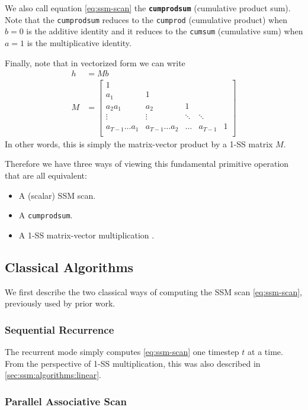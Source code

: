 \documentclass{article}
\begin{document}
We also call equation \eqref{eq:ssm-scan} the \textbf{\texttt{cumprodsum}} (cumulative product sum).
Note that the \texttt{cumprodsum} reduces to the \texttt{cumprod} (cumulative product) when $b = 0$ is the additive identity and it reduces to the \texttt{cumsum} (cumulative sum) when $a=1$ is the multiplicative identity.

Finally, note that in vectorized form we can write
\begin{align*}
  h &= M b \\
  M &=
  \begin{bmatrix}
    1 & \\
    a_1 & 1 & \\
    a_2a_1 & a_2 & 1 \\
    \vdots & \vdots & \ddots & \ddots \\
    a_{T-1}\dots a_1 & a_{T-1}\dots a_2 & \dots & a_{T-1} & 1 \\
  \end{bmatrix}
\end{align*}
In other words, this is simply the matrix-vector product by a 1-SS matrix $M$.

Therefore we have three ways of viewing this fundamental primitive operation that are all equivalent:
\begin{itemize}
  \item A (scalar) SSM scan.
  \item A \texttt{cumprodsum}.
  \item A 1-SS matrix-vector multiplication .
\end{itemize}

\subsection{Classical Algorithms}

We first describe the two classical ways of computing the SSM scan \eqref{eq:ssm-scan},
previously used by prior work.

\subsubsection{Sequential Recurrence}
\label{sec:scan:recurrence}

The recurrent mode simply computes \eqref{eq:ssm-scan} one timestep $t$ at a time.
From the perspective of 1-SS multiplication, this was also described in \cref{sec:ssm:algorithms:linear}.

\subsubsection{Parallel Associative Scan}
\label{sec:scan:classical:parallel}
\end{document}
